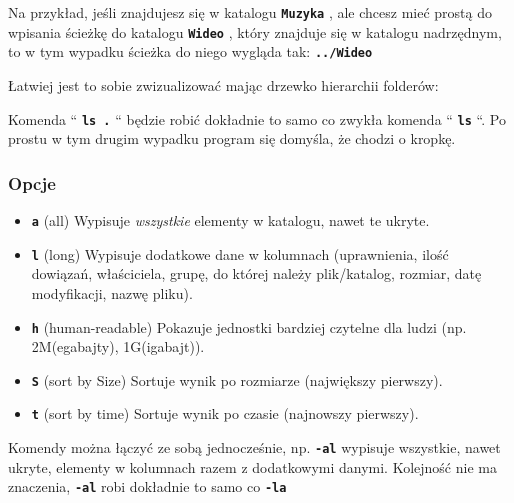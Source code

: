 \documentclass[11pt, a4paper]{article}
\newcommand{\ttbf}[1]{
    \texttt{\textbf{#1}}
}
\begin{document}
Na przykład, jeśli znajdujesz się w katalogu \ttbf{Muzyka}, ale chcesz mieć prostą do wpisania ścieżkę do katalogu \ttbf{Wideo}, który znajduje się w katalogu nadrzędnym, to w tym wypadku ścieżka do niego wygląda tak: \ttbf{../Wideo}

Łatwiej jest to sobie zwizualizować mając drzewko hierarchii folderów:

\hfill

Komenda ``\ttbf{ls .}`` będzie robić dokładnie to samo co zwykła komenda ``\ttbf{ls}``. Po prostu w tym drugim wypadku program się domyśla, że chodzi o kropkę.

\subsubsection{Opcje}
\begin{itemize}
    \item \ttbf{a} (all) Wypisuje \emph{wszystkie} elementy w katalogu, nawet te ukryte.
    \item \ttbf{l} (long) Wypisuje dodatkowe dane w kolumnach (uprawnienia, ilość dowiązań, właściciela, grupę, do której należy plik/katalog, rozmiar, datę modyfikacji, nazwę pliku).
    \item \ttbf{h} (human-readable) Pokazuje jednostki bardziej czytelne dla ludzi (np. 2M(egabajty), 1G(igabajt)).
    \item \ttbf{S} (sort by Size) Sortuje wynik po rozmiarze (największy pierwszy).
    \item \ttbf{t} (sort by time) Sortuje wynik po czasie (najnowszy pierwszy).
\end{itemize}

Komendy można łączyć ze sobą jednocześnie, np. \ttbf{-al} wypisuje wszystkie, nawet ukryte, elementy w kolumnach razem z dodatkowymi danymi. Kolejność nie ma znaczenia, \ttbf{-al} robi dokładnie to samo co \ttbf{-la}
\end{document}
